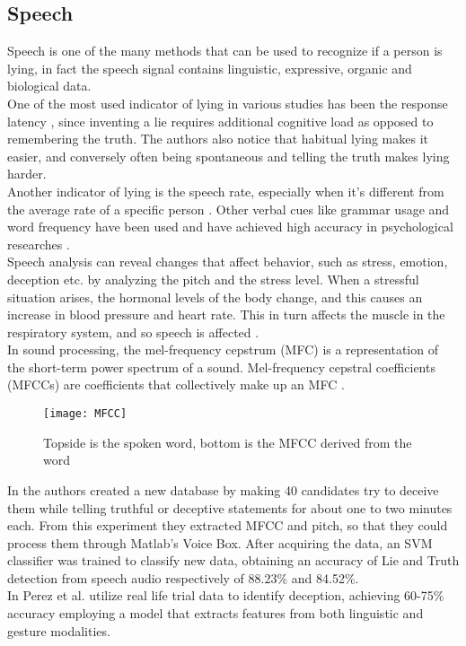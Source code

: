 \subsection*{Speech}
Speech is one of the many methods that can be used to recognize if a person is lying, in fact the speech signal contains linguistic, expressive, organic and biological data. \cite{norena}\\
One of the most used indicator of lying in various studies has been the response latency \cite{EaseLying}, since inventing a lie requires additional cognitive load as opposed to remembering the truth. The authors also notice that habitual lying makes it easier, and conversely often being spontaneous and telling the truth makes lying harder.\\
Another indicator of lying is the speech rate, especially when it's different from the average rate of a specific person \cite{TemporalCues}. Other verbal cues like grammar usage and word frequency have been used and have achieved high accuracy in psychological researches \cite{PorterTruthLying}.\\
Speech analysis can reveal changes that affect behavior, such as stress, emotion, deception etc. by analyzing the pitch and the stress level. When a stressful situation arises, the hormonal levels of the body change, and this causes an increase in blood pressure and heart rate. This in turn affects the muscle in the respiratory system, and so speech is affected \cite{norena}. \\
In sound processing, the mel-frequency cepstrum (MFC) is a representation of the short-term power spectrum of a sound. Mel-frequency cepstral coefficients (MFCCs) are coefficients that collectively make up an MFC \cite{wiki:mfcc}. \\
\begin{figure}[H]
	\centering
	\texttt{[image: MFCC]}
	\caption{Topside is the spoken word, bottom is the MFCC derived from the word}
\end{figure}
In \cite{relidss} the authors created a new database by making 40 candidates try to deceive them while telling truthful or deceptive statements for about one to two minutes each. From this experiment they extracted MFCC and pitch, so that they could process them through Matlab's Voice Box. After acquiring the data, an SVM classifier was trained to classify new data, obtaining an accuracy of Lie and Truth detection from speech audio respectively of 88.23\% and 84.52\%. \\
In \cite{Perez-Rosas:2015:DDU:2818346.2820758} \cite{Mihalcea:2013:ADD:2522848.2522888} Perez et al. utilize real life trial data to identify deception, achieving 60-75\% accuracy employing a model that extracts features from both linguistic and gesture modalities.
 
